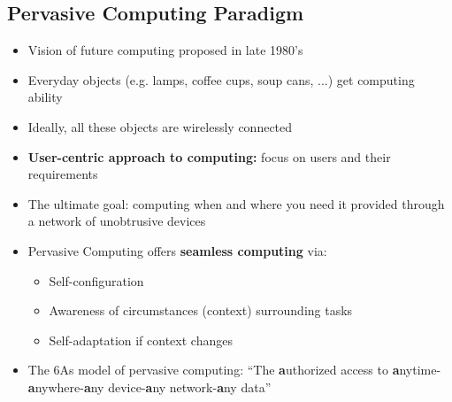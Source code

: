 \subsection{Pervasive Computing Paradigm}
\begin{itemize}
	\item Vision of future computing proposed in late 1980's
	\item Everyday objects (e.g. lamps, coffee cups, soup cans, ...) get computing ability
	\item Ideally, all these objects are wirelessly connected
	\item \textbf{User-centric approach to computing:} focus on users and their requirements
	\item The ultimate goal: computing when and where you need it provided through a network of unobtrusive devices
\end{itemize}
\vspace{2em}
\begin{itemize}
	\item Pervasive Computing offers \textbf{seamless computing} via:
	\begin{itemize}
		\item Self-configuration
		\item Awareness of circumstances (context) surrounding tasks
		\item Self-adaptation if context changes
	\end{itemize}
	\item The 6As model of pervasive computing: ``The \textbf{a}uthorized access to \textbf{a}nytime-\textbf{a}nywhere-\textbf{a}ny device-\textbf{a}ny network-\textbf{a}ny data''	
\end{itemize}

